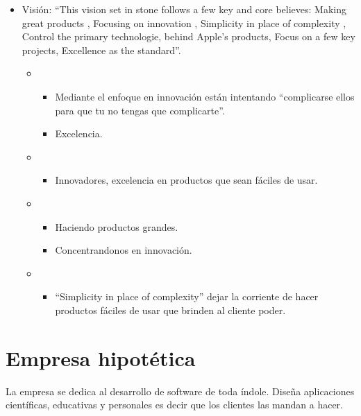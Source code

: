 \documentclass{article}
\begin{document}
\begin{itemize}
    \item Visión: ``This vision set in stone follows a few key and core believes: Making great products , Focusing on innovation , Simplicity in place of complexity , Control the primary technologie, behind Apple's products, Focus on a few key projects, Excellence as the standard''.
        \begin{itemize}
            \item {} 
                \begin{itemize}
                    \item Mediante el enfoque en innovación están intentando ``complicarse ellos para que tu no tengas que complicarte''.
                    \item Excelencia.
                \end{itemize}
                
            \item {} 
                \begin{itemize}
                    \item Innovadores, excelencia en productos que sean fáciles de usar.
                \end{itemize}
                
            \item {} 
                \begin{itemize}
                    \item Haciendo productos grandes.
                    \item Concentrandonos en innovación.
                \end{itemize}
                
            \item {} 
                \begin{itemize}
                    \item ``Simplicity in place of complexity'' dejar la corriente de hacer productos fáciles de usar que brinden al cliente poder.
                \end{itemize}
                
        \end{itemize}
\end{itemize}

\section{Empresa hipotética}
La empresa se dedica al desarrollo de software de toda índole. Diseña aplicaciones científicas, educativas y personales es decir que los clientes las mandan a hacer.
\end{document}
